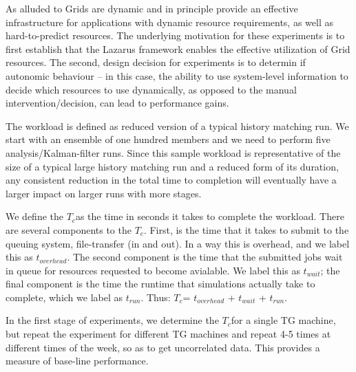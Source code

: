 \documentclass[conference,final]{IEEEtran}
\newcommand{\tc}{$T_c$}
\newcommand{\jhanote}[1]{ {\textcolor{red} { ***Jha: #1 }}}
\newcommand{\yyenote}[1]{ {\textcolor{blue} { ***yye00: #1 }}}
\newcommand{\jhanote}[1]{}
\newcommand{\yyenote}[1]{}
\begin{document}
As alluded to Grids are dynamic and in principle provide an effective
infrastructure for applications with dynamic resource requirements, as
well as hard-to-predict resources. The underlying motivation for these
experiments is to first establish that the Lazarus framework enables
the effective utilization of Grid resources. The second, design
decision for experiments is to determin if autonomic behaviour -- in
this case, the ability to use system-level information to decide which
resources to use dynamically, as opposed to the manual
intervention/decision, can lead to performance gains.


The workload is defined as reduced version of a typical history
matching run. We start with an ensemble of one hundred members and we
need to perform five analysis/Kalman-filter runs. Since this sample
workload is representative of the size of a typical large history
matching run and a reduced form of its duration, any consistent
reduction in the total time to completion will eventually have a
larger impact on larger runs with more stages.

We define the \tc as the time in seconds it takes to complete the
workload. There are several components to the \tc. First, is the time
that it takes to submit to the queuing system, file-transfer (in and
out). In a way this is overhead, and we label this as $t_{overhead}$.
The second component is the time that the submitted jobs wait in queue
for resources requested to become avialable. We label this as
$t_{wait}$; the final component is the time the runtime that
simulations actually take to complete, which we label as
$t_{run}$. Thus: \tc = $t_{overhead}$ + $t_{wait}$ + $t_{run}$.

In the first stage of experiments, we determine the \tc for a single
TG machine, but repeat the experiment for different TG machines and
repeat 4-5 times at different times of the week, so as to get
uncorrelated data.  This provides a measure of base-line performance.
\end{document}
